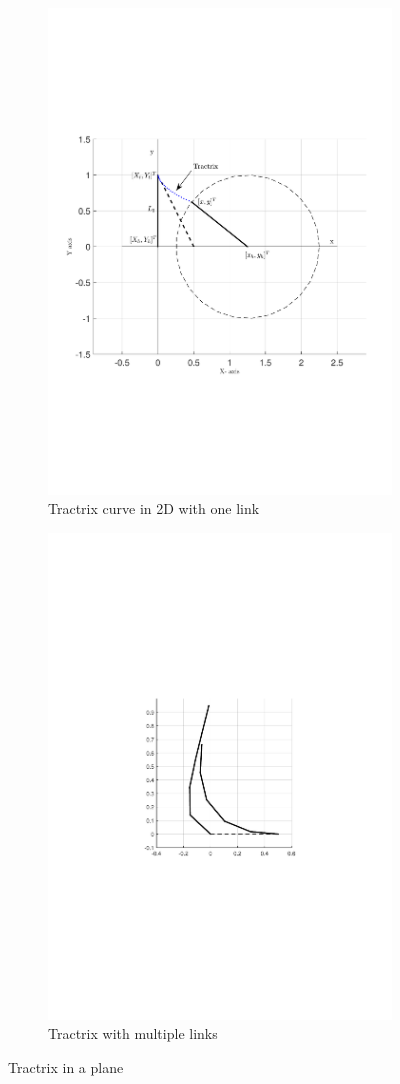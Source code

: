 \documentclass[12pt,a4]{article}
\begin{document}
\begin{figure}[ht!]
    \centering
    \begin{subfigure}{0.48\textwidth}
        \centering
        \includegraphics[width=0.75\linewidth]{figures/fig1.pdf}
        \caption{Tractrix curve in 2D with one link}
        \label{fig:tractrixin2D}
    \end{subfigure}%
    \begin{subfigure}{0.48\textwidth}
        \centering
        \includegraphics[width=0.75\linewidth]{figures/fig2.pdf}
        \caption{Tractrix with multiple links}
    \end{subfigure}
\caption{Tractrix in a plane}
\end{figure}
\end{document}
